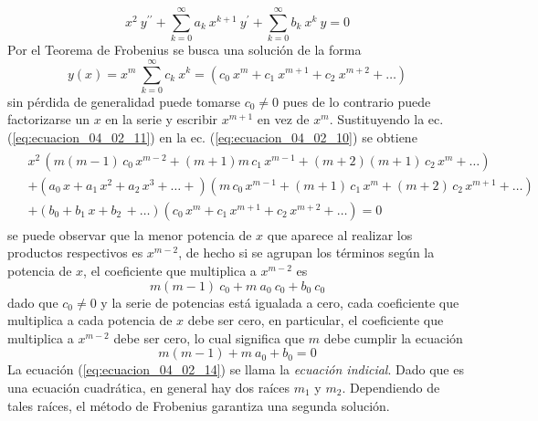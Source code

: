 \begin{equation}
x^{2} \: y^{\prime \prime} + \sum_{k=0}^{\infty} a_{k} \: x^{k+1} \: y^{\prime} + \sum_{k=0}^{\infty} b_{k} \: x^{k} \: y = 0
\label{eq:ecuacion_04_02_10}
\end{equation}
Por el Teorema de Frobenius se busca una solución de la forma
\begin{equation}
y(x) = x^{m} \: \sum_{k=0}^{\infty} c_{k} \: x^{k} =  (c_{0} \: x^{m} + c_{1} \: x^{m+1} + c_{2} \: x^{m+2} + \ldots )
\label{eq:ecuacion_04_02_11}
\end{equation}
sin pérdida de generalidad puede tomarse $c_{0} \neq 0$ pues de lo contrario puede factorizarse un $x$ en la serie y escribir $x^{m+1}$ en vez de $x^{m}$. Sustituyendo la ec. (\ref{eq:ecuacion_04_02_11}) en la ec. (\ref{eq:ecuacion_04_02_10}) se obtiene
\begin{align}
\begin{aligned}
 &{} x^{2} \, (m (m-1) \, c_{0} \, x^{m-2} + (m+1) m \, c_{1} \, x^{m-1} + (m+2)(m+1) \, c_{2} \, x^{m} + \ldots ) \\
 &+ (a_{0} \, x + a_{1} \, x^{2} + a_{2} \, x^{3} + \ldots + )(m \, c_{0} \, x^{m-1} + (m+1) \, c_{1} \, x^{m} + (m+2) \, c_{2} \, x^{m+1} + \ldots ) \\
 &+ (b_{0} + b_{1} \, x + b_{2} \, + \ldots )(c_{0} \, x^{m} + c_{1} \, x^{m+1} + c_{2} \, x^{m+2} + \ldots ) = 0
\end{aligned}
\label{eq:ecuacion_04_02_12}
\end{align}
se puede observar que la menor potencia de $x$ que aparece al realizar los productos respectivos es $x^{m-2}$, de hecho si se agrupan los términos según la potencia de $x$, el coeficiente que multiplica a $x^{m-2}$ es
\begin{equation}
m(m-1) \: c_{0} + m \: a_{0} \: c_{0} + b_{0} \: c_{0}
\label{eq:ecuacion_04_02_13}
\end{equation}
dado que $c_{0} \neq 0$ y la serie de potencias está igualada a cero, cada coeficiente que multiplica a cada potencia de $x$ debe ser cero, en particular, el coeficiente que multiplica a $x^{m-2}$ debe ser cero, lo cual significa que $m$ debe cumplir la ecuación
\begin{equation}
m (m-1) + m \: a_{0} + b_{0} = 0
\label{eq:ecuacion_04_02_14}
\end{equation}
La ecuación (\ref{eq:ecuacion_04_02_14}) se llama la \emph{ecuación indicial}. Dado que es una ecuación cuadrática, en general hay dos raíces $m_{1}$ y $m_{2}$. Dependiendo de tales raíces, el método de Frobenius garantiza una segunda solución.
